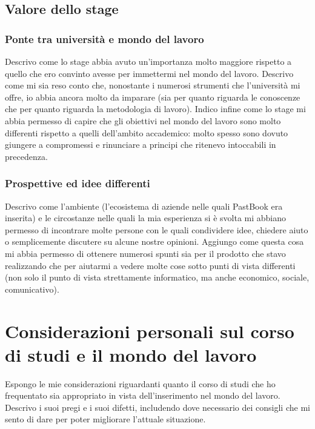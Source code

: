 		\subsection{Valore dello stage}
			\subsubsection{Ponte tra università e mondo del lavoro}
				Descrivo come lo stage abbia avuto un'importanza molto maggiore rispetto a quello che ero convinto avesse per
				immettermi nel mondo del lavoro. Descrivo come mi sia reso conto che, nonostante i numerosi strumenti che
				l'università mi offre, io abbia ancora molto da imparare (sia per quanto riguarda le conoscenze che per quanto
				riguarda la metodologia di lavoro). Indico infine come lo stage mi abbia permesso di capire che gli obiettivi nel
				mondo del lavoro sono molto differenti rispetto a quelli dell'ambito accademico: molto spesso sono dovuto giungere
				a compromessi e rinunciare a principi che ritenevo intoccabili in precedenza.
			\subsubsection{Prospettive ed idee differenti}
				Descrivo come l'ambiente (l'ecosistema di aziende nelle quali PastBook era inserita) e le circostanze nelle quali la
				mia esperienza si è svolta mi abbiano permesso di incontrare molte persone con le quali condividere idee, chiedere
				aiuto o semplicemente discutere su alcune nostre opinioni. Aggiungo come questa cosa mi abbia permesso di ottenere
				numerosi spunti sia per il prodotto che stavo realizzando che per aiutarmi a vedere molte cose sotto punti di vista
				differenti (non solo il punto di vista strettamente informatico, ma anche economico, sociale, comunicativo).
	\section{Considerazioni personali sul corso di studi e il mondo del lavoro}
		Espongo le mie considerazioni riguardanti quanto il corso di studi che ho frequentato sia appropriato in vista dell'inserimento
		nel mondo del lavoro. Descrivo i suoi pregi e i suoi difetti, includendo dove necessario dei consigli che mi sento di dare per
		poter migliorare l'attuale situazione.
